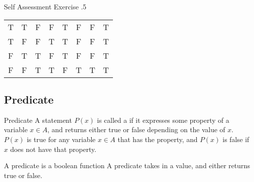 \documentclass[\main/notes.tex]{subfiles}
\begin{document}
				\begin{exercise}{Self Assessment Exercise \thechapter.5}
					\begin{center}
						\begin{tabular}{| c c | c c | c | c | c | c|}
							\hline
							\tablehead{$p$} & \tablehead{$q$} & \tablehead{$\lnot p$} & \tablehead{$\lnot q$} & \tablehead{$p \lor q$} & \tablehead{$\lnot (p \lor q)$} & \tablehead{$(\lnot p) \land (\lnot q)$} & \tablehead{$\lnot (p \lor q) \leftrightarrow (\lnot p) \land (\lnot q)$}\\
							\hline
							T & T & F & F & T & F & F & T\\
							T & F & F & T & T & F & F & T\\
							F & T & T & F & T & F & F & T\\
							F & F & T & T & F & T & T & T\\
							\hline
						\end{tabular}
					\end{center}
				\end{exercise}
			\subsection{Predicate}
				\begin{definition}{Predicate}
					A statement $P(x)$ is called a  if it expresses some property of a variable $x \in A$, and returns either true or false depending on the value of $x$. $P(x)$ is true for any variable $x \in A$ that has the property, and $P(x)$ is false if $x$ does not have that property.
				\end{definition}
				\begin{sidenote}[width=0.65\textwidth]{A predicate is a boolean function}
					A predicate takes in a value, and either returns true or false.
				\end{sidenote}
\end{document}
